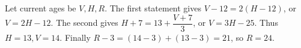 Let current ages be $V,H,R$. The first statement gives $V-12=2(H-12)$, or $V=2H-12$. The second gives $H+7=13+\dfrac{V+7}{3}$, or $V=3H-25$. Thus $H=13,V=14$. Finally $R-3=(14-3)+(13-3)=21$, so $\boxed{R=24}$.

